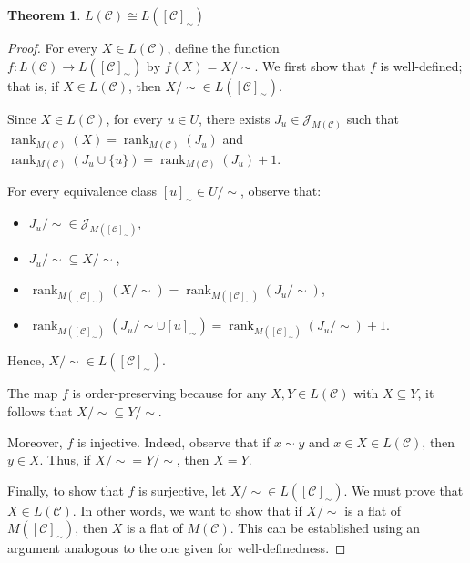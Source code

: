 \documentclass{article}
\newtheorem{theorem}{Theorem}[section]
\begin{document}
\begin{theorem}\label{simplification}
$
L(\mathcal{C}) \cong L([\mathcal{C}]_{\sim})
$
\end{theorem}

\begin{proof}

\noindent
For every \( X \in L(\mathcal{C}) \), define the function
$
f : L(\mathcal{C}) \to L([\mathcal{C}]_{\sim})
\text{      by       }
f(X) = X/{\sim}.
$
We first show that \( f \) is well-defined; that is, if \( X \in L(\mathcal{C}) \), then \( X/{\sim} \in L([\mathcal{C}]_{\sim}) \).

Since \( X \in L(\mathcal{C}) \), for every \( u \in U \), there exists \( J_u \in \mathcal{J}_{M(\mathcal{C})} \) such that
$\operatorname{rank}_{M(\mathcal{C})}(X) = \operatorname{rank}_{M(\mathcal{C})}(J_u)$
and
$\operatorname{rank}_{M(\mathcal{C})}(J_u \cup \{u\}) = \operatorname{rank}_{M(\mathcal{C})}(J_u) + 1.$

For every equivalence class \( [u]_{\sim} \in U/{\sim} \), observe that:
\begin{itemize}
    \item \( J_u/{\sim} \in \mathcal{J}_{M([\mathcal{C}]_{\sim})} \),
    \item \( J_u/{\sim} \subseteq X/{\sim} \),
    \item \( \operatorname{rank}_{M([\mathcal{C}]_{\sim})}(X/{\sim}) = \operatorname{rank}_{M([\mathcal{C}]_{\sim})}(J_u/{\sim}) \),
    \item \( \operatorname{rank}_{M([\mathcal{C}]_{\sim})}(J_u/{\sim} \cup [u]_{\sim}) = \operatorname{rank}_{M([\mathcal{C}]_{\sim})}(J_u/{\sim}) + 1 \).
\end{itemize}
Hence, \( X/{\sim} \in L([\mathcal{C}]_{\sim}) \).

The map \( f \) is order-preserving because for any \( X, Y \in L(\mathcal{C}) \) with \( X \subseteq Y \), it follows that \( X/{\sim} \subseteq Y/{\sim} \).

Moreover, \( f \) is injective. Indeed, observe that if
$x\sim y$ and $x \in X\in L(\mathcal{C})$, then $y \in X$. Thus, if \( X/{\sim} = Y/{\sim} \), then \( X = Y \).

Finally, to show that \( f \) is surjective, let \( X/{\sim} \in L([\mathcal{C}]_{\sim}) \). We must prove that \( X \in L(\mathcal{C}) \). In other words, we want to show that if \( X/{\sim} \) is a flat of \( M([\mathcal{C}]_{\sim}) \), then \( X \) is a flat of \( M(\mathcal{C}) \). This can be established using an argument analogous to the one given for well-definedness.


\end{proof}
\end{document}

